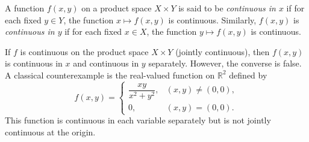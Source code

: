 A function $f(x, y)$ on a product space $X \times Y$ is said to be \emph{continuous in $x$} if for each fixed $y \in Y$, the function $x \mapsto f(x, y)$ is continuous. Similarly, $f(x, y)$ is \emph{continuous in $y$} if for each fixed $x \in X$, the function $y \mapsto f(x, y)$ is continuous.

If $f$ is continuous on the product space $X \times Y$ (jointly continuous), then $f(x, y)$ is continuous in $x$ and continuous in $y$ separately. However, the converse is false. A classical counterexample is the real-valued function on $\mathbb{R}^2$ defined by
\[
f(x, y) = \begin{cases}
\dfrac{xy}{x^2 + y^2}, & (x, y) \neq (0, 0), \\[6pt]
0, & (x, y) = (0, 0).
\end{cases}
\]
This function is continuous in each variable separately but is not jointly continuous at the origin.
